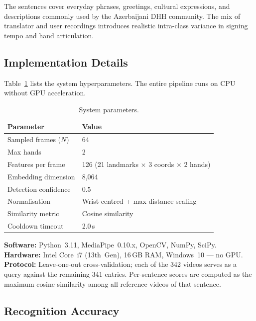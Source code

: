 \documentclass[runningheads]{llncs}
\begin{document}
The sentences cover everyday phrases, greetings, cultural expressions,
and descriptions commonly used by the Azerbaijani DHH community.
The mix of translator and user recordings introduces realistic
intra-class variance in signing tempo and hand articulation.

\subsection{Implementation Details}\label{sec:implementation}

Table~\ref{tab:system} lists the system hyperparameters.
The entire pipeline runs on CPU without GPU acceleration.

\begin{table}[t]
\centering
\caption{System parameters.}
\label{tab:system}
\begin{tabular}{@{}ll@{}}
\toprule
Parameter & Value \\
\midrule
Sampled frames ($N$) & 64 \\
Max hands & 2 \\
Features per frame & 126 (21 landmarks $\times$ 3 coords $\times$ 2 hands) \\
Embedding dimension & 8{,}064 \\
Detection confidence & 0.5 \\
Normalisation & Wrist-centred + max-distance scaling \\
Similarity metric & Cosine similarity \\
Cooldown timeout & 2.0\,s \\
\bottomrule
\end{tabular}
\end{table}

\noindent
\textbf{Software:} Python~3.11, MediaPipe~0.10.x, OpenCV, NumPy,
SciPy.\\
\textbf{Hardware:} Intel Core~i7 (13th~Gen), 16\,GB RAM, Windows~10 —
no GPU.\\
\textbf{Protocol:} Leave-one-out cross-validation; each of the 342
videos serves as a query against the remaining 341 entries.
Per-sentence scores are computed as the maximum cosine similarity among
all reference videos of that sentence.

\subsection{Recognition Accuracy}\label{sec:accuracy}
\end{document}
